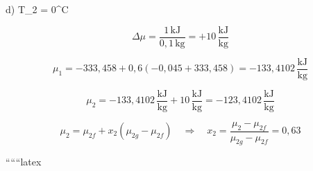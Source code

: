 d) \quad T_2 = 0^\circ C

\[
\Delta \mu = \frac{1 \, \text{kJ}}{0,1 \, \text{kg}} = +10 \, \frac{\text{kJ}}{\text{kg}}
\]

\[
\mu_1 = -333,458 + 0,6 \left( -0,045 + 333,458 \right) = -133,4102 \, \frac{\text{kJ}}{\text{kg}}
\]

\[
\mu_2 = -133,4102 \, \frac{\text{kJ}}{\text{kg}} + 10 \, \frac{\text{kJ}}{\text{kg}} = -123,4102 \, \frac{\text{kJ}}{\text{kg}}
\]

\[
\mu_2 = \mu_{2f} + x_2 \left( \mu_{2g} - \mu_{2f} \right) \quad \Rightarrow \quad x_2 = \frac{\mu_2 - \mu_{2f}}{\mu_{2g} - \mu_{2f}} = 0,63
\]

``````latex